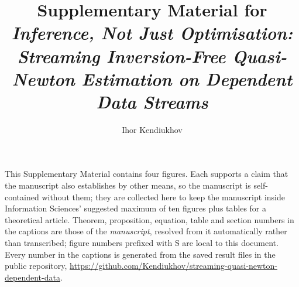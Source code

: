 \documentclass[11pt]{article}
\title{Supplementary Material for\\
       \emph{Inference, Not Just Optimisation: Streaming Inversion-Free
       Quasi-Newton Estimation on Dependent Data Streams}}
\author{Ihor Kendiukhov}
\date{}
\begin{document}
\maketitle

\noindent
This Supplementary Material contains four figures. Each supports a claim that the manuscript also
establishes by other means, so the manuscript is self-contained without them; they are collected
here to keep the manuscript inside Information Sciences' suggested maximum of ten figures plus
tables for a theoretical article. Theorem, proposition, equation, table and section numbers in
the captions are those of the \emph{manuscript}, resolved from it automatically rather than
transcribed; figure numbers prefixed with S are local to this document. Every number in the captions is generated from the
saved result files in the public repository,
\url{https://github.com/Kendiukhov/streaming-quasi-newton-dependent-data}.

\bigskip









\end{document}
